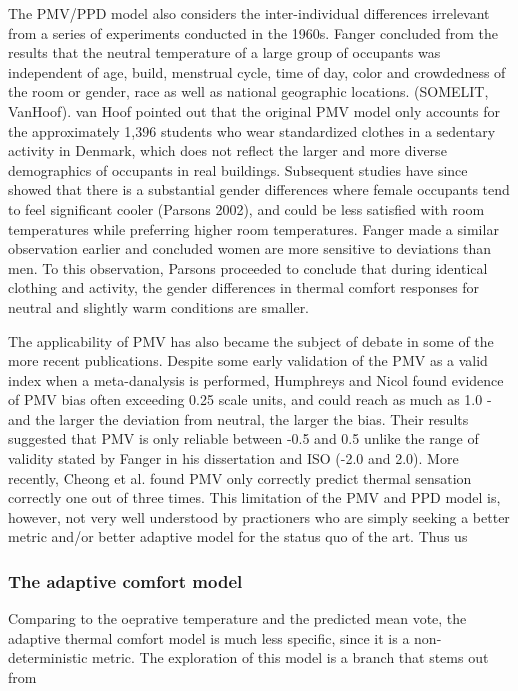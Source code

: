         The PMV/PPD model also considers the inter-individual differences irrelevant from a series of experiments conducted in the 1960s. Fanger concluded from the results that the neutral temperature of a large group of occupants was independent of age, build, menstrual cycle, time of day, color and crowdedness of the room or gender, race as well as national geographic locations\cite{fanger_thermal_1970}. (SOMELIT, VanHoof). van Hoof pointed out that the original PMV model only accounts for the approximately 1,396 students who wear standardized clothes in a sedentary activity in Denmark, which does not reflect the larger and more diverse demographics of occupants in real buildings. Subsequent studies have since showed that there is a substantial gender differences where female occupants tend to feel significant cooler (Parsons 2002), and could be less satisfied with room temperatures while preferring higher room temperatures. Fanger made a similar observation earlier and concluded women are more sensitive to deviations than men. To this observation, Parsons proceeded to conclude that during identical clothing and activity, the gender differences in thermal comfort responses for neutral and slightly warm conditions are smaller. 
        
        The applicability of PMV has also became the subject of debate in some of the more recent publications. Despite some early validation of the PMV as a valid index when a meta-danalysis is performed, Humphreys and Nicol\cite{humphreys_validity_2002} found evidence of PMV bias often exceeding 0.25 scale units, and could reach as much as 1.0 - and the larger the deviation from neutral, the larger the bias. Their results suggested that PMV is only reliable between -0.5 and 0.5 unlike the range of validity stated by Fanger in his dissertation \cite{fanger_calculation_1967} and ISO (-2.0 and 2.0). More recently,  Cheong et al. found PMV only correctly predict thermal sensation correctly one out of three times\cite{cheong_local_2007}. This limitation of the PMV and PPD model is, however, not very well understood by practioners who are simply seeking a better metric and/or better adaptive model for the status quo of the art. Thus us 
        
\subsubsection{The adaptive comfort model}
    Comparing to the oeprative temperature and the predicted mean vote, the adaptive thermal comfort model is much less specific, since it is a non-deterministic metric. The exploration of this model is a branch that stems out from 
    
